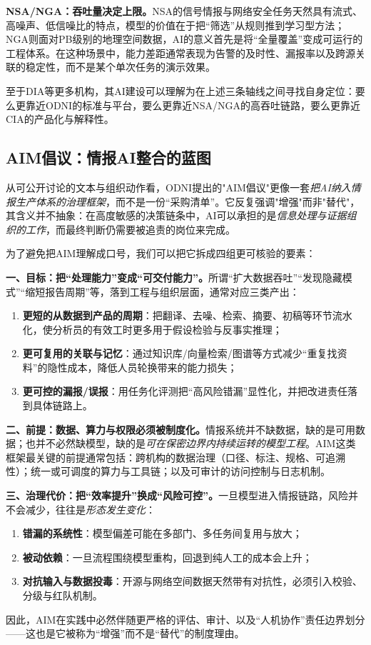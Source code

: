             {\bfseries NSA/NGA：吞吐量决定上限。}NSA的信号情报与网络安全任务天然具有流式、高噪声、低信噪比的特点，模型的价值在于把“筛选”从规则推到学习型方法；NGA则面对PB级别的地理空间数据，AI的意义首先是将“全量覆盖”变成可运行的工程体系。在这种场景中，能力差距通常表现为告警的及时性、漏报率以及跨源关联的稳定性，而不是某个单次任务的演示效果。

至于DIA等更多机构，其AI建设可以理解为在上述三条轴线之间寻找自身定位：要么更靠近ODNI的标准与平台，要么更靠近NSA/NGA的高吞吐链路，要么更靠近CIA的产品化与解释性。

\subsection{AIM倡议：情报AI整合的蓝图}

从可公开讨论的文本与组织动作看，ODNI提出的"AIM倡议"更像一套\emph{把AI纳入情报生产体系的治理框架}，而不是一份“采购清单”。它反复强调"增强"而非"替代"，其含义并不抽象：在高度敏感的决策链条中，AI可以承担的是\emph{信息处理与证据组织的工作}，而最终判断仍需要被追责的岗位来完成。

为了避免把AIM理解成口号，我们可以把它拆成四组更可核验的要素：

            {\bfseries 一、目标：把“处理能力”变成“可交付能力”。}所谓“扩大数据吞吐”“发现隐藏模式”“缩短报告周期”等，落到工程与组织层面，通常对应三类产出：
\begin{enumerate}[label=(\arabic*)]
    \item \textbf{更短的从数据到产品的周期}：把翻译、去噪、检索、摘要、初稿等环节流水化，使分析员的有效工时更多用于假设检验与反事实推理；
    \item \textbf{更可复用的关联与记忆}：通过知识库/向量检索/图谱等方式减少“重复找资料”的隐性成本，降低人员轮换带来的能力损失；
    \item \textbf{更可控的漏报/误报}：用任务化评测把“高风险错漏”显性化，并把改进责任落到具体链路上。
\end{enumerate}

            {\bfseries 二、前提：数据、算力与权限必须被制度化。}情报系统并不缺数据，缺的是可用数据；也并不必然缺模型，缺的是\emph{可在保密边界内持续运转的模型工程}。AIM这类框架最关键的前提通常包括：跨机构的数据治理（口径、标注、规格、可追溯性）；统一或可调度的算力与工具链；以及可审计的访问控制与日志机制。

            {\bfseries 三、治理代价：把“效率提升”换成“风险可控”。}一旦模型进入情报链路，风险并不会减少，往往是\emph{形态发生变化}：
\begin{enumerate}[label=(\arabic*)]
    \item \textbf{错漏的系统性}：模型偏差可能在多部门、多任务间复用与放大；
    \item \textbf{被动依赖}：一旦流程围绕模型重构，回退到纯人工的成本会上升；
    \item \textbf{对抗输入与数据投毒}：开源与网络空间数据天然带有对抗性，必须引入校验、分级与红队机制。
\end{enumerate}
因此，AIM在实践中必然伴随更严格的评估、审计、以及“人机协作”责任边界划分——这也是它被称为“增强”而不是“替代”的制度理由。

